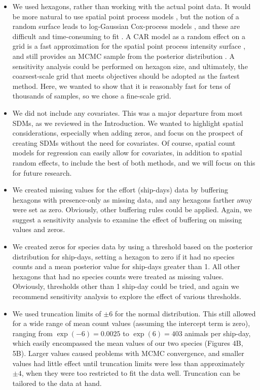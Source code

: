 \documentclass[11pt, titlepage]{article}
\begin{document}
\begin{spacing}{1.9}
\begin{flushleft}
\begin{itemize}
  \item We used hexagons, rather than working with the actual point data.  It would be more natural to use spatial point process models \citep{warton_poisson_2010, renner_equivalence_2013, renner_point_2015}, but the notion of a random surface leads to log-Gaussian Cox-process models \citep{moller_log_1998}, and these are difficult and time-consuming to fit \citep{teng_bayesian_2017}.  A CAR model as a random effect on a grid is a fast approximation for the spatial point process intensity surface \citep{rathbun_space-time_1994}, and still provides an MCMC sample from the posterior distribution \citep{besag_discussion_1994}.  A sensitivity analysis could be performed \citep[][p. 415]{kery_applied_2016} on hexagon size, and ultimately, the coarsest-scale grid that meets objectives should be adopted as the fastest method.  Here, we wanted to show that it is reasonably fast for tens of thousands of samples, so we chose a fine-scale grid.
  \item We did not include any covariates.  This was a major departure from most SDMs, as we reviewed in the Introduction.  We wanted to highlight spatial considerations, especially when adding zeros, and focus on the prospect of creating SDMs without the need for covariates.  Of course, spatial count models for regression can easily allow for covariates, in addition to spatial random effects, to include the best of both methods, and we will focus on this for future research.
  \item We created missing values for the effort (ship-days) data by buffering hexagons with presence-only as missing data, and any hexagons farther away were set as zero.  Obviously, other buffering rules could be applied.  Again, we suggest a sensitivity analysis to examine the effect of buffering on missing values and zeros.
  \item We created zeros for species data by using a threshold based on the posterior distribution for ship-days, setting a hexagon to zero if it had no species counts and a mean posterior value for ship-days greater than 1.  All other hexagons that had no species counts were treated as missing values.  Obviously, thresholds other than 1 ship-day could be tried, and again we recommend sensitivity analysis to explore the effect of various thresholds.
  \item We used truncation limits of $\pm6$ for the normal distribution. This still allowed for a wide range of mean count values (assuming the intercept term is zero), ranging from $\exp(-6) = 0.0025$ to $\exp(6) = 403$ animals per ship-day, which easily encompassed the mean values of our two species (Figures 4B, 5B). Larger values caused problems with MCMC convergence, and smaller values had little effect until truncation limits were less than approximately $\pm4$, when they were too restricted to fit the data well. Truncation can be tailored to the data at hand.
\end{itemize}


\end{flushleft}
\end{spacing}
\end{document}
